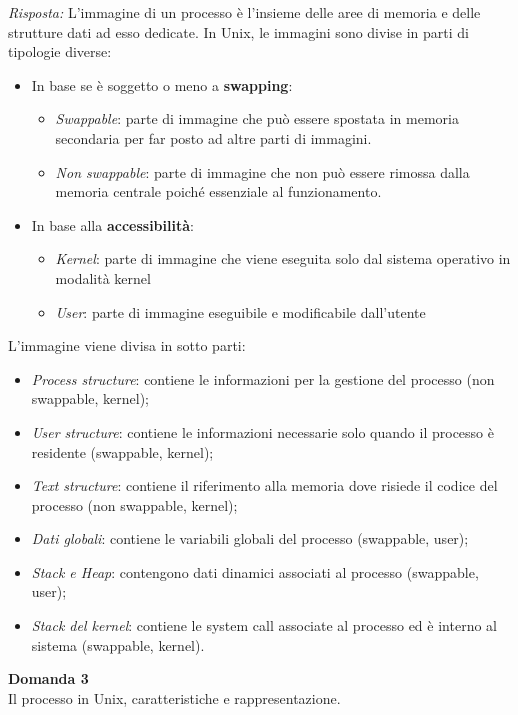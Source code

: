 \documentclass{article}
\newenvironment{problem}[2][Domanda]
    { \begin{mdframed}[backgroundcolor=gray!20] \textbf{#1 #2} \\}
    {  \end{mdframed}}
\newenvironment{solution}
    {\textit{Risposta:}}
    {}
\begin{document}
\begin{solution}
L’immagine di un processo è l’insieme delle aree di memoria e delle strutture dati ad esso dedicate. In Unix, le immagini sono divise in parti di tipologie diverse:
\begin{itemize}
    \item In base se è soggetto o meno a \textbf{swapping}:
    \begin{itemize}
        \item \emph{Swappable}: parte di immagine che può essere spostata in memoria secondaria per far posto ad altre parti di immagini.
        \item \emph{Non swappable}: parte di immagine che non può essere rimossa dalla memoria centrale poiché essenziale al funzionamento.
    \end{itemize}
    \item In base alla \textbf{accessibilità}:
    \begin{itemize}
        \item \emph{Kernel}: parte di immagine che viene eseguita solo dal sistema operativo in modalità kernel
        \item \emph{User}: parte di immagine eseguibile e modificabile dall’utente 
    \end{itemize}
\end{itemize}
L’immagine viene divisa in sotto parti:
\begin{itemize}
    \item \emph{Process structure}: contiene le informazioni per la gestione del processo (non swappable, kernel);
    \item \emph{User structure}: contiene le informazioni necessarie solo quando il processo è residente (swappable, kernel);
    \item \emph{Text structure}: contiene il riferimento alla memoria dove risiede il codice del processo (non swappable, kernel);
    \item \emph{Dati globali}: contiene le variabili globali del processo (swappable, user);
    \item \emph{Stack e Heap}: contengono dati dinamici associati al processo (swappable, user); 
    \item \emph{Stack del kernel}: contiene le system call associate al processo ed è interno al sistema (swappable, kernel).
\end{itemize}
\newpage
\end{solution}
\begin{problem}{3}
Il processo in Unix, caratteristiche e rappresentazione.
\end{problem}
\end{document}
